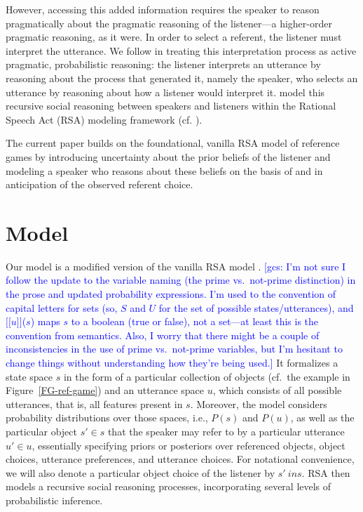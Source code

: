 \documentclass[10pt,a4paper]{article}
\newcommand{\sem}[1]{\mbox{$[\![$#1$]\!]$}}
\newcommand{\gcs}[1]{\textcolor{blue}{[gcs: #1]}}
\begin{document}
However, accessing this added information requires the speaker to reason pragmatically about the pragmatic reasoning of the listener---a higher-order pragmatic reasoning, as it were.
In order to select a referent, the listener must interpret the utterance. We follow  in treating this interpretation process as active pragmatic, probabilistic reasoning: the listener interprets an utterance by reasoning about the process that generated it, namely the speaker, who selects an utterance by reasoning about how a listener would interpret it. \citeauthor{frankgoodman2012} model this recursive social reasoning between speakers and listeners within the Rational Speech Act (RSA) modeling framework (cf. ).

The current paper builds on the foundational, vanilla RSA model of reference games by introducing uncertainty about the prior beliefs of the listener and modeling a speaker who reasons about these beliefs on the basis of and in anticipation of the observed referent choice. 



\section{Model}
Our model is a modified version of the vanilla RSA model \cite{frankgoodman2012}. \gcs{I'm not sure I follow the update to the variable naming (the prime vs.~not-prime distinction) in the prose and updated probability expressions. I'm used to the convention of capital letters for sets (so, $S$ and $U$ for the set of possible states/utterances), and \sem{$u$}($s$) maps $s$ to a boolean (true or false), not a set---at least this is the convention from semantics. Also, I worry that there might be a couple of inconsistencies in the use of prime vs.~not-prime variables, but I'm hesitant to change things without understanding how they're being used.}
It formalizes a state space $s$ in the form of a particular collection of objects (cf.~the example in Figure~\ref{FG-ref-game}) and an utterance space $u$,
which consists of all possible utterances, that is, all features present in $s$. 
Moreover, the model considers probability distributions over those spaces, i.e., $P(s)$ and $P(u)$, as well as the particular object $s'\in s$ that the speaker may refer to by a particular utterance $u' \in u$, essentially specifying priors or posteriors over referenced objects, object choices, utterance preferences, and utterance choices. 
For notational convenience, we will also denote a particular object choice of the listener by $s' \ in s$.
RSA then models a recursive social reasoning processes, incorporating several levels of probabilistic inference. 
\end{document}
